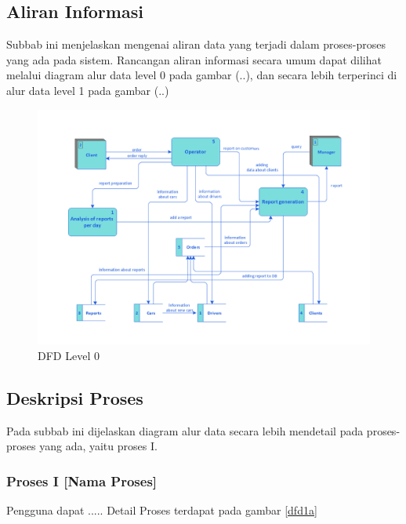 

  \subsection{Aliran Informasi}
  Subbab ini menjelaskan mengenai aliran data yang terjadi dalam proses-proses yang ada pada sistem. Rancangan aliran informasi secara umum dapat dilihat melalui diagram alur data level 0 pada gambar (..), dan secara lebih terperinci di alur data level 1 pada gambar (..)
      \begin{figure}[htp]
        \centering
        \includegraphics[width=1.0\columnwidth]{images/bab3/Taxi-service-dfd.png}
        \caption{DFD Level 0}
        \label{DFD0}
      \end{figure}
      
  \subsection{Deskripsi Proses}
  
  Pada subbab ini dijelaskan diagram alur data secara lebih mendetail pada proses-proses yang ada, yaitu proses I.
  
  \subsubsection{Proses I [Nama Proses]}
  Pengguna dapat ..... Detail Proses terdapat pada gambar \ref{dfd1a} 
  
